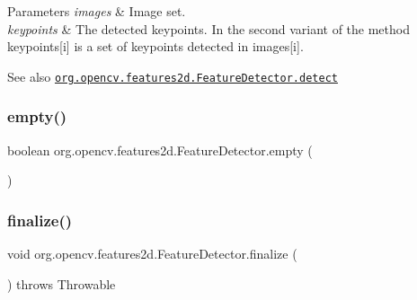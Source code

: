 \begin{DoxyParams}{Parameters}
{\em images} & Image set. \\
\hline
{\em keypoints} & The detected keypoints. In the second variant of the method {\ttfamily keypoints\mbox{[}i\mbox{]}} is a set of keypoints detected in {\ttfamily images\mbox{[}i\mbox{]}}.\\
\hline
\end{DoxyParams}
\begin{DoxySeeAlso}{See also}
\href{http://docs.opencv.org/modules/features2d/doc/common_interfaces_of_feature_detectors.html#featuredetector-detect}{\tt org.\+opencv.\+features2d.\+Feature\+Detector.\+detect} 
\end{DoxySeeAlso}
\mbox{\label{classorg_1_1opencv_1_1features2d_1_1_feature_detector_ae6bf0d1c57cad788985a945b78cf5095}} 
\subsubsection{\texorpdfstring{empty()}{empty()}}
{\footnotesize\ttfamily boolean org.\+opencv.\+features2d.\+Feature\+Detector.\+empty (\begin{DoxyParamCaption}{ }\end{DoxyParamCaption})}

\mbox{\label{classorg_1_1opencv_1_1features2d_1_1_feature_detector_a5a738fcae17faaff22d9ce400190d166}} 
\subsubsection{\texorpdfstring{finalize()}{finalize()}}
{\footnotesize\ttfamily void org.\+opencv.\+features2d.\+Feature\+Detector.\+finalize (\begin{DoxyParamCaption}{ }\end{DoxyParamCaption}) throws Throwable\hspace{0.3cm}{\ttfamily [protected]}}


